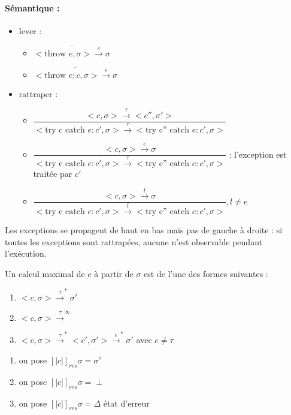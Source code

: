 \documentclass[10pt,a4paper]{article}
\newcommand{\semm}[1]{\left[| #1 | \right]}
\begin{document}
\paragraph*{Sémantique : }
\begin{itemize}
\item lever : \begin{itemize}
\item $\overline{<\text{throw }e, \sigma> \xrightarrow{e} \sigma}$
\item $\overline{<\text{throw }e ;c , \sigma> \xrightarrow{e} \sigma}$
\end{itemize}
\item rattraper : \begin{itemize}
\item $\dfrac{< c, \sigma > \xrightarrow{\tau} < c'', \sigma' >}{<\text{try c catch }e:c', \sigma > \xrightarrow{\tau} <\text{try c'' catch }e:c', \sigma > }$\\
\item  $\dfrac{< c, \sigma > \xrightarrow{e} \sigma}{<\text{try c catch }e:c', \sigma > \xrightarrow{\tau} <\text{try c'' catch }e:c', \sigma > }$ : l'exception est traitée par $c'$\\
\item  $\dfrac{< c, \sigma > \xrightarrow{l} \sigma}{<\text{try c catch }e:c', \sigma > \xrightarrow{l} <\text{try c'' catch }e:c', \sigma > }, l \not = e$
\end{itemize}
\end{itemize}
\begin{rem}{} Les exceptions se propagent de  haut en bas mais pas de gauche à droite :  si toutes les exceptions sont rattrapées, aucune n'est observable pendant l'exécution.\\
\end{rem}

\begin{thm}{} Un calcul maximal de c à partir de $\sigma$ est de l'une des formes suivantes : 
\begin{enumerate}
\item $<c, \sigma> \xrightarrow{\tau}^* \sigma'$
\item $<c, \sigma> \xrightarrow{\tau}^{\infty}$
\item $<c, \sigma> \xrightarrow{\tau}^* <c',\sigma'> \xrightarrow{e}^* \sigma'$ avec $e \not = \tau$
\end{enumerate}
\begin{enumerate}
\item on pose $\semm{c}_{res} \sigma = \sigma'$
\item on pose $\semm{c}_{res} \sigma = \perp$
\item on pose $\semm{c}_{res} \sigma = \Delta$ état d'erreur
\end{enumerate}
\end{thm}
\end{document}
